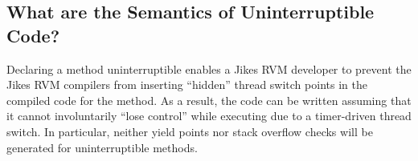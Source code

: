 \subsection{What are the Semantics of Uninterruptible Code?\label{uninterruptible_code}}%
%
%
%
%
%
%
%

Declaring a method uninterruptible enables a Jikes RVM developer to
prevent the Jikes RVM compilers from inserting ``hidden'' thread
switch points in the compiled code for the method.  As a result, the
code can be written assuming that it cannot involuntarily ``lose
control'' while executing due to a timer-driven thread switch. In
particular, neither yield points nor stack overflow
checks will be generated for uninterruptible methods. 

